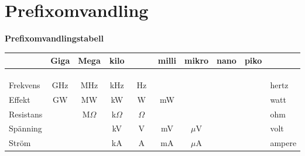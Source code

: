 \onecolumn

\chapter{Prefixomvandling}

%

\begin{center}
		\textbf{\Huge{Prefixomvandlingstabell}}
\end{center}

\begin{longtable}{|l|c|c|c|c|c|c|c|c|c|c|c|l|c|c|c|c|c|c|c|c|c|c|c|c|l|} \hline
	&\multicolumn{3}{c}{Giga}\vline&\multicolumn{3}{c}{Mega}\vline&\multicolumn{3}{c}{kilo}\vline&\multicolumn{3}{r}{}\vline
	&\multicolumn{3}{c}{milli}\vline&\multicolumn{3}{c}{mikro}\vline&\multicolumn{3}{c}{nano}\vline&\multicolumn{3}{c}{piko}\vline & \\ \hline \hline
	& & & & & & & & & & & & & & & & & & & & & & & & & \\ \hline
	& & & & & & & & & & & & & & & & & & & & & & & & & \\ \hline
	& & & & & & & & & & & & & & & & & & & & & & & & & \\ \hline \hline
	Frekvens &\multicolumn{3}{c}{GHz}\vline & \multicolumn{3}{c}{MHz}\vline & \multicolumn{3}{c}{kHz}\vline & \multicolumn{3}{c}{Hz}\vline & \multicolumn{3}{c}{}\vline & \multicolumn{3}{c}{}\vline & \multicolumn{3}{c}{}\vline & \multicolumn{3}{c}{ }\vline & hertz \\ \hline 
	Effekt & \multicolumn{3}{c}{GW}\vline&\multicolumn{3}{c}{MW}\vline& \multicolumn{3}{c}{kW}\vline&\multicolumn{3}{c}{W}\vline&\multicolumn{3}{c}{mW}\vline &\multicolumn{3}{c}{}\vline&\multicolumn{3}{c}{}\vline&\multicolumn{3}{c}{ }\vline& watt \\ \hline
	Resistans& \multicolumn{3}{c}{}\vline&\multicolumn{3}{c}{M\(\Omega\)}\vline&\multicolumn{3}{c}{k\(\Omega\)}\vline &\multicolumn{3}{c}{\(\Omega\)}\vline&\multicolumn{3}{c}{}\vline &\multicolumn{3}{c}{}\vline&\multicolumn{3}{c}{}\vline&\multicolumn{3}{c}{ }\vline& ohm\\ \hline
	Spänning& \multicolumn{3}{c}{}\vline&\multicolumn{3}{c}{}\vline&\multicolumn{3}{c}{kV}\vline &\multicolumn{3}{c}{V}\vline&\multicolumn{3}{c}{mV}\vline &\multicolumn{3}{c}{\(\mu\)V}\vline&\multicolumn{3}{c}{}\vline&\multicolumn{3}{c}{ }\vline& volt\\ \hline
	Ström& \multicolumn{3}{c}{}\vline&\multicolumn{3}{c}{}\vline&\multicolumn{3}{c}{kA}\vline &\multicolumn{3}{c}{A}\vline&\multicolumn{3}{c}{mA}\vline &\multicolumn{3}{c}{\(\mu\)A}\vline&\multicolumn{3}{c}{}\vline&\multicolumn{3}{c}{ }\vline& ampere\\ \hline

\end{longtable}
